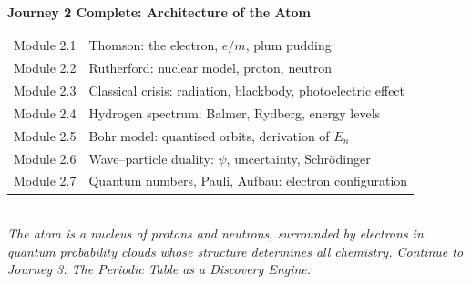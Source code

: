 \documentclass[12pt, a4paper]{book}
\begin{document}
\vspace{1.5em}
\begin{center}
\begin{tcolorbox}[enhanced,
  colback=JourneyColor!12, colframe=JourneyColor,
  width=0.9\textwidth, arc=4pt]
\centering\sffamily
\textbf{\large Journey 2 Complete: Architecture of the Atom}\\[8pt]
\small
\begin{tabular}{ll}
Module 2.1 & Thomson: the electron, $e/m$, plum pudding \\
Module 2.2 & Rutherford: nuclear model, proton, neutron \\
Module 2.3 & Classical crisis: radiation, blackbody, photoelectric effect \\
Module 2.4 & Hydrogen spectrum: Balmer, Rydberg, energy levels \\
Module 2.5 & Bohr model: quantised orbits, derivation of $E_n$ \\
Module 2.6 & Wave--particle duality: $\psi$, uncertainty, Schr\"{o}dinger \\
Module 2.7 & Quantum numbers, Pauli, Aufbau: electron configuration \\
\end{tabular}\\[8pt]
\textit{The atom is a nucleus of protons and neutrons, surrounded by
electrons in quantum probability clouds whose structure determines
all chemistry. Continue to Journey 3: The Periodic Table as a
Discovery Engine.}
\end{tcolorbox}
\end{center}
\end{document}
